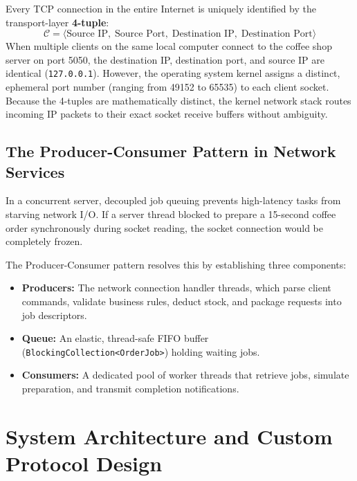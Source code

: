 \documentclass[12pt,a4paper]{article}
\begin{document}
Every TCP connection in the entire Internet is uniquely identified by the transport-layer \textbf{4-tuple}:
\begin{equation}
    \mathcal{C} = \langle \text{Source IP},\; \text{Source Port},\; \text{Destination IP},\; \text{Destination Port} \rangle
\end{equation}
When multiple clients on the same local computer connect to the coffee shop server on port 5050, the destination IP, destination port, and source IP are identical (\texttt{127.0.0.1}). However, the operating system kernel assigns a distinct, ephemeral port number (ranging from 49152 to 65535) to each client socket. Because the 4-tuples are mathematically distinct, the kernel network stack routes incoming IP packets to their exact socket receive buffers without ambiguity.

\subsection{The Producer-Consumer Pattern in Network Services}
In a concurrent server, decoupled job queuing prevents high-latency tasks from starving network I/O. If a server thread blocked to prepare a 15-second coffee order synchronously during socket reading, the socket connection would be completely frozen.

The Producer-Consumer pattern resolves this by establishing three components:
\begin{itemize}
    \item \textbf{Producers:} The network connection handler threads, which parse client commands, validate business rules, deduct stock, and package requests into job descriptors.
    \item \textbf{Queue:} An elastic, thread-safe FIFO buffer (\texttt{BlockingCollection<OrderJob>}) holding waiting jobs.
    \item \textbf{Consumers:} A dedicated pool of worker threads that retrieve jobs, simulate preparation, and transmit completion notifications.
\end{itemize}

\section{System Architecture and Custom Protocol Design}
\end{document}
